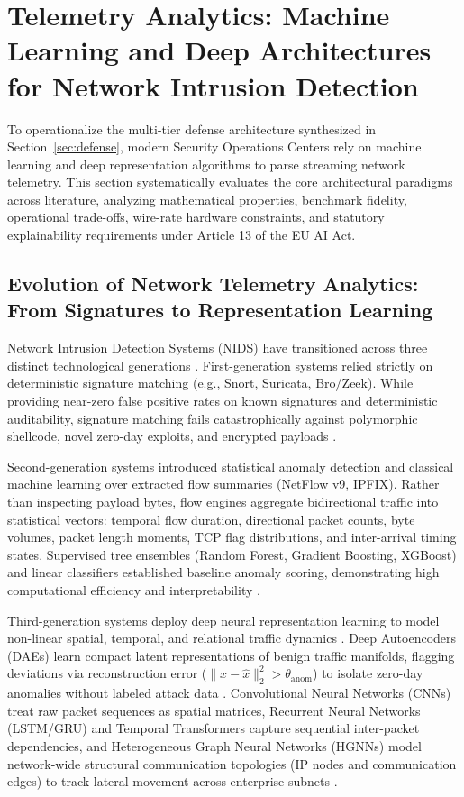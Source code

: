 \documentclass[conference,10pt,twocolumn,a4paper]{IEEEtran}
\begin{document}
\section{Telemetry Analytics: Machine Learning and Deep Architectures for Network Intrusion Detection}
\label{sec:ids_architectures}
To operationalize the multi-tier defense architecture synthesized in Section~\ref{sec:defense}, modern Security Operations Centers rely on machine learning and deep representation algorithms to parse streaming network telemetry. This section systematically evaluates the core architectural paradigms across literature, analyzing mathematical properties, benchmark fidelity, operational trade-offs, wire-rate hardware constraints, and statutory explainability requirements under Article 13 of the EU AI Act.

\subsection{Evolution of Network Telemetry Analytics: From Signatures to Representation Learning}
Network Intrusion Detection Systems (NIDS) have transitioned across three distinct technological generations \cite{ozkan2024cybersecurity, mirsky2018kitsune}. First-generation systems relied strictly on deterministic signature matching (e.g., Snort, Suricata, Bro/Zeek). While providing near-zero false positive rates on known signatures and deterministic auditability, signature matching fails catastrophically against polymorphic shellcode, novel zero-day exploits, and encrypted payloads \cite{carlini2017towards, fang2024llm}.

Second-generation systems introduced statistical anomaly detection and classical machine learning over extracted flow summaries (NetFlow v9, IPFIX). Rather than inspecting payload bytes, flow engines aggregate bidirectional traffic into statistical vectors: temporal flow duration, directional packet counts, byte volumes, packet length moments, TCP flag distributions, and inter-arrival timing states. Supervised tree ensembles (Random Forest, Gradient Boosting, XGBoost) and linear classifiers established baseline anomaly scoring, demonstrating high computational efficiency and interpretability \cite{ozkan2024cybersecurity}.

Third-generation systems deploy deep neural representation learning to model non-linear spatial, temporal, and relational traffic dynamics \cite{kaur2023deep, gokstorp2026survey}. Deep Autoencoders (DAEs) learn compact latent representations of benign traffic manifolds, flagging deviations via reconstruction error ($\|x - \hat{x}\|_2^2 > \theta_{\mathrm{anom}}$) to isolate zero-day anomalies without labeled attack data \cite{mirsky2018kitsune}. Convolutional Neural Networks (CNNs) treat raw packet sequences as spatial matrices, Recurrent Neural Networks (LSTM/GRU) and Temporal Transformers capture sequential inter-packet dependencies, and Heterogeneous Graph Neural Networks (HGNNs) model network-wide structural communication topologies (IP nodes and communication edges) to track lateral movement across enterprise subnets \cite{jiang2024provenance}.
\end{document}
